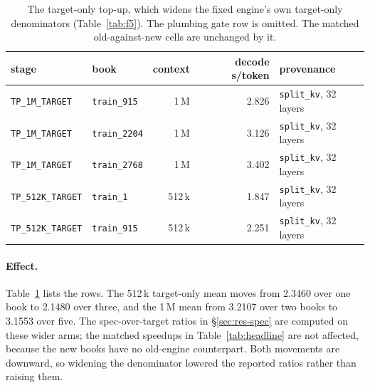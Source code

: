 \documentclass{article}
\begin{document}
\begin{table}[h]
\centering\footnotesize
\caption{Speculation against the same engine's target-only path, on matched books only, all
under blocking wait. Decode-only is the ratio of s/token; end-to-end is the ratio of mean
tokens per second over the same matched books, so it includes prefill. The 128\,k target-only
arm measured one book, so only that book is matched there. This is the table the main text
quotes.}
\label{tab:f5}

\end{table}

\begin{table}[h]
\centering\footnotesize
\caption{The target-only top-up, which widens the fixed engine's own target-only
denominators (Table~\ref{tab:f5}). The plumbing gate row is omitted. The matched
old-against-new cells are unchanged by it.}
\label{tab:topup}
\setlength{\tabcolsep}{3pt}\begin{tabular}{llrrl}
\toprule
stage & book & context & decode s/token & provenance \\
\midrule
\texttt{TP\_1M\_TARGET} & \texttt{train\_915} & 1\,M & 2.826 & \texttt{split\_kv}, 32 layers \\
\texttt{TP\_1M\_TARGET} & \texttt{train\_2204} & 1\,M & 3.126 & \texttt{split\_kv}, 32 layers \\
\texttt{TP\_1M\_TARGET} & \texttt{train\_2768} & 1\,M & 3.402 & \texttt{split\_kv}, 32 layers \\
\texttt{TP\_512K\_TARGET} & \texttt{train\_1} & 512\,k & 1.847 & \texttt{split\_kv}, 32 layers \\
\texttt{TP\_512K\_TARGET} & \texttt{train\_915} & 512\,k & 2.251 & \texttt{split\_kv}, 32 layers \\
\bottomrule
\end{tabular}
\end{table}

\paragraph{Effect.} Table~\ref{tab:topup} lists the rows. The 512\,k target-only mean moves
from 2.3460 over one book to 2.1480 over three, and the 1\,M mean from 3.2107 over two books to 3.1553 over five. The spec-over-target
ratios in \S\ref{sec:res-spec} are computed on these wider arms; the matched speedups in
Table~\ref{tab:headline} are not affected, because the new books have no old-engine
counterpart. Both movements are downward, so widening the denominator lowered the reported
ratios rather than raising them.
\end{document}
